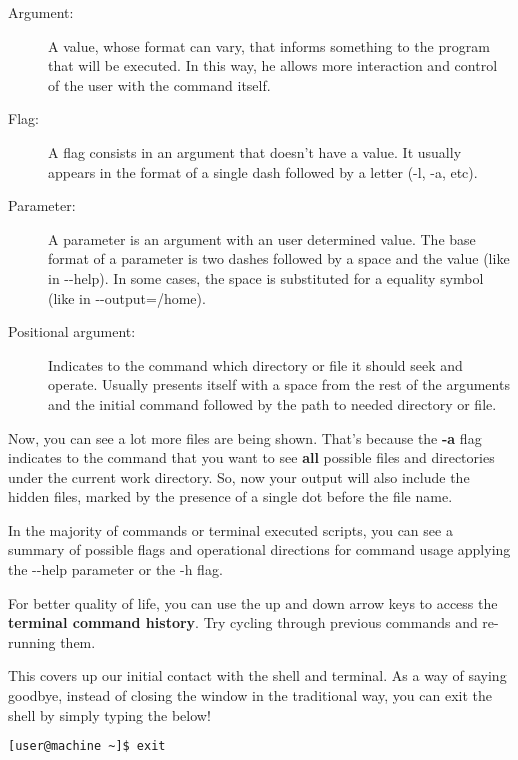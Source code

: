 \documentclass[a4paper,11pt]{article}
\begin{document}
\begin{definitionbox}
    \begin{description}
        \item[Argument:] A value, whose format can vary, that informs something
            to the program that will be executed. In this way, he allows more
            interaction and control of the user with the command itself.
        \item[Flag:] A flag consists in an argument that doesn't have a value.
            It usually appears in the format of a single dash followed by a letter
            (-l, -a, etc).
        \item[Parameter:] A parameter is an argument with an user determined
            value. The base format of a parameter is two dashes followed by
            a space and the value (like in -{}-help). In some cases, the space
            is substituted for a equality symbol (like in -{}-output=/home). 
        \item[Positional argument:] Indicates to the command which directory or
            file it should  seek and operate. Usually presents itself with
            a space from the rest of the arguments and the initial command
            followed by the path to needed directory or file.
    \end{description}
\end{definitionbox}
Now, you can see a lot more files are being shown. That's because the
\textbf{-a} flag indicates to the command that you want to see \textbf{all}
possible files and directories under the current work directory. So, now your
output will also include the hidden files, marked by the presence of a single
dot before the file name.\par
\begin{remarkbox}
In the majority of commands or terminal executed scripts, you can see a summary
of possible flags and operational directions for command usage applying the
-{}-help parameter or the -h flag.
\end{remarkbox}
\begin{tipbox}
    For better quality of life, you can use the up and down arrow keys to
    access the \textbf{terminal command history}. Try cycling through previous
    commands and re-running them.
\end{tipbox}
This covers up our initial contact with the shell and terminal. As a way of
saying goodbye, instead of closing the window in the traditional way, you can
exit the shell by simply typing the below!
\begin{lstlisting}[language=bash]
   [user@machine ~]$ exit 
\end{lstlisting}
\end{document}
